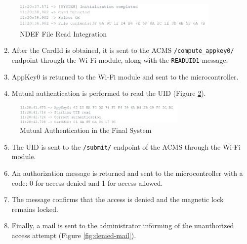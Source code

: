 \begin{figure}[H]
	\centering
	\includegraphics[width=0.9\textwidth]{imaxes/CARDIDREAD}
	\caption{NDEF File Read Integration}
	\label{fig:ndef-read}
\end{figure}

\begin{enumerate}
	\setcounter{enumi}{1}
	\item After the CardId is obtained, it is sent to the ACMS \texttt{/compute\_appkey0/} endpoint through the Wi-Fi module, along with the \texttt{READUID1} message.
	\item AppKey0 is returned to the Wi-Fi module and sent to the microcontroller.
	\item Mutual authentication is performed to read the UID (Figure \ref{fig:mutual-auth}).
\end{enumerate}

\begin{figure}[H]
	\centering
	\includegraphics[width=0.75\textwidth]{imaxes/mutualauth_UID}
	\caption{Mutual Authentication in the Final System}
	\label{fig:mutual-auth}
\end{figure}

\begin{enumerate}
	\setcounter{enumi}{4}
	\item The UID is sent to the \texttt{/submit/} endpoint of the ACMS through the Wi-Fi module.
	\item An authorization message is returned and sent to the microcontroller with a code: 0 for access denied and 1 for access allowed.
	\item The message confirms that the access is denied and the magnetic lock remains locked.
	\item Finally, a mail is sent to the administrator informing of the unauthorized access attempt (Figure \ref{fig:denied-mail}).
\end{enumerate}

